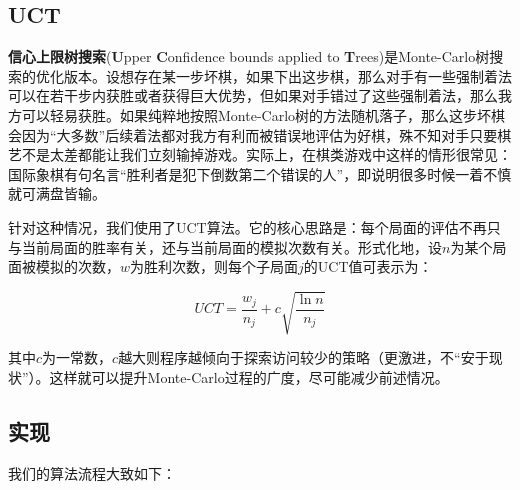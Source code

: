 \documentclass{article}
\begin{document}
	\subsection{UCT}
	
	\textbf{信心上限树搜索}(\textbf{U}pper \textbf{C}onfidence bounds applied to \textbf{T}rees)是Monte-Carlo树搜索的优化版本。设想存在某一步坏棋，如果下出这步棋，那么对手有一些强制着法可以在若干步内获胜或者获得巨大优势，但如果对手错过了这些强制着法，那么我方可以轻易获胜。如果纯粹地按照Monte-Carlo树的方法随机落子，那么这步坏棋会因为“大多数”后续着法都对我方有利而被错误地评估为好棋，殊不知对手只要棋艺不是太差都能让我们立刻输掉游戏。实际上，在棋类游戏中这样的情形很常见：国际象棋有句名言“胜利者是犯下倒数第二个错误的人”，即说明很多时候一着不慎就可满盘皆输。
	
	针对这种情况，我们使用了UCT算法。它的核心思路是：每个局面的评估不再只与当前局面的胜率有关，还与当前局面的模拟次数有关。形式化地，设$n$为某个局面被模拟的次数，$w$为胜利次数，则每个子局面$j$的UCT值可表示为：
	
	\begin{equation}
		UCT = \frac{w_j}{n_j} + c\sqrt{\frac{\ln{n}}{n_j}}
	\end{equation}

	其中$c$为一常数，$c$越大则程序越倾向于探索访问较少的策略（更激进，不“安于现状”）。这样就可以提升Monte-Carlo过程的广度，尽可能减少前述情况。
	
	\subsection{实现}
	
	我们的算法流程大致如下：
	
	
	
\end{document}
